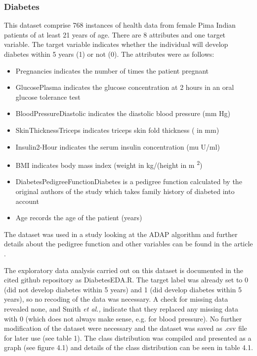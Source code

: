 \subsubsection{Diabetes}
This dataset comprise 768 instances of health data from female Pima Indian patients of at least 21 years of age. There are 8 attributes and one target variable. The target variable indicates whether the individual will develop diabetes within 5 years (1) or not (0). The attributes were as follows:
\begin{itemize}
    \item Pregnancies indicates the number of times the patient pregnant
    \item GlucosePlasma indicates the glucose concentration at 2 hours in an oral glucose tolerance test
    \item BloodPressureDiastolic indicates the diastolic blood pressure (mm Hg)
    \item SkinThicknessTriceps indicates triceps skin fold thickness ( in mm)
    \item Insulin2-Hour indicates the serum insulin concentration  (mu U/ml)
    \item BMI indicates body mass index (weight in kg/(height in m \textsuperscript{2})
    \item DiabetesPedigreeFunctionDiabetes is a pedigree function calculated by the original authors of the study which takes family history of diabeted into account
    \item Age records the age of the patient (years)
\end{itemize}
 The dataset was used in a study looking at the ADAP algorithm and further details about the pedigree function and other variables can be found in the article \cite{Smith:1988wy}.
 
The exploratory data analysis carried out on this dataset is documented in the cited github repository as DiabetesEDA.R.\newline
The target label was already set to 0 (did not develop diabetes within 5 years) and 1 (did develop diabetes within 5 years), so no recoding of the data was necessary.\newline
A check for missing data revealed none, and Smith \textit{et al.,} indicate that they replaced any missing data with 0 (which does not always make sense, e.g. for blood pressure). No further modification of the dataset were necessary and the dataset was saved as .csv file for later use (see table 1).
The class distribution was compiled and presented as a graph (see figure 4.1) and details of the class distribution can be seen in table 4.1. 

